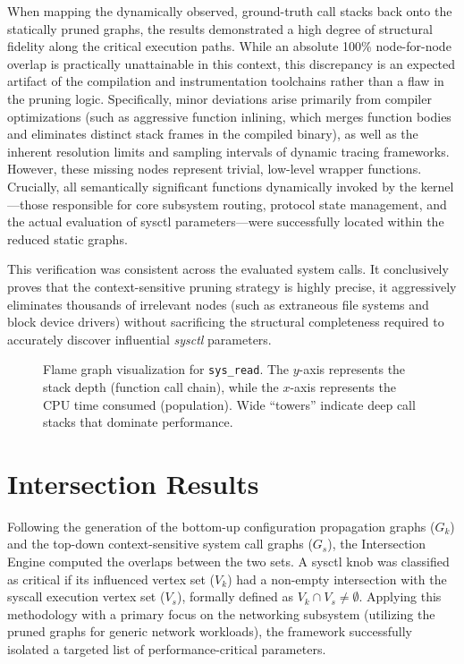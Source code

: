 When mapping the dynamically observed, ground-truth call stacks back onto the statically pruned graphs, the results demonstrated a high degree of structural fidelity along the critical execution paths.
While an absolute 100\% node-for-node overlap is practically unattainable in this context, this discrepancy is an expected artifact of the compilation and instrumentation toolchains rather than a flaw in the pruning logic.
Specifically, minor deviations arise primarily from compiler optimizations (such as aggressive function inlining, which merges function bodies and eliminates distinct stack frames in the compiled binary), as well as the inherent resolution limits and sampling intervals of dynamic tracing frameworks.
However, these missing nodes represent trivial, low-level wrapper functions.
Crucially, all semantically significant functions dynamically invoked by the kernel—those responsible for core subsystem routing, protocol state management, and the actual evaluation of sysctl parameters—were successfully located within the reduced static graphs.

This verification was consistent across the evaluated system calls.
It conclusively proves that the context-sensitive pruning strategy is highly precise, it aggressively eliminates thousands of irrelevant nodes (such as extraneous file systems and block device drivers) without sacrificing the structural completeness required to accurately discover influential \textit{sysctl} parameters.

\begin{figure}[ht]
    \centering
    
    \caption{Flame graph visualization for \texttt{sys\_read}. The $y$-axis represents the stack depth (function call chain), while the $x$-axis represents the CPU time consumed (population). Wide ``towers'' indicate deep call stacks that dominate performance.}
    \label{fig:sysread_flame}
\end{figure}

\section{Intersection Results}

Following the generation of the bottom-up configuration propagation graphs ($G_k$) and the top-down context-sensitive system call graphs ($G_s$), the Intersection Engine computed the overlaps between the two sets.
A sysctl knob was classified as critical if its influenced vertex set ($V_k$) had a non-empty intersection with the syscall execution vertex set ($V_s$), formally defined as $V_k \cap V_s \neq \emptyset$.
Applying this methodology with a primary focus on the networking subsystem (utilizing the pruned graphs for generic network workloads), the framework successfully isolated a targeted list of performance-critical parameters.

